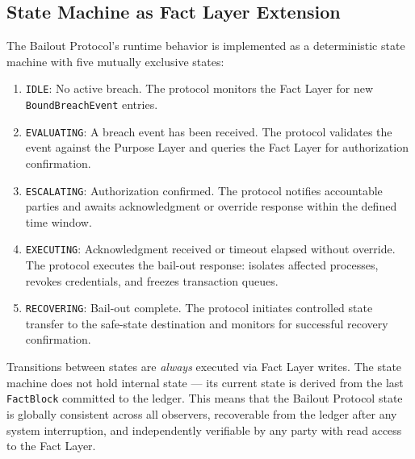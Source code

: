\subsection{State Machine as Fact Layer Extension}
\label{sec:state-machine-fact-extension}

The Bailout Protocol's runtime behavior is implemented as a deterministic state machine with five mutually exclusive states:

\begin{enumerate}
    \item \texttt{IDLE}: No active breach. The protocol monitors the Fact Layer for new \texttt{BoundBreachEvent} entries.
    \item \texttt{EVALUATING}: A breach event has been received. The protocol validates the event against the Purpose Layer and queries the Fact Layer for authorization confirmation.
    \item \texttt{ESCALATING}: Authorization confirmed. The protocol notifies accountable parties and awaits acknowledgment or override response within the defined time window.
    \item \texttt{EXECUTING}: Acknowledgment received or timeout elapsed without override. The protocol executes the bail-out response: isolates affected processes, revokes credentials, and freezes transaction queues.
    \item \texttt{RECOVERING}: Bail-out complete. The protocol initiates controlled state transfer to the safe-state destination and monitors for successful recovery confirmation.
\end{enumerate}

Transitions between states are \textit{always} executed via Fact Layer writes. The state machine does not hold internal state — its current state is derived from the last \texttt{FactBlock} committed to the ledger. This means that the Bailout Protocol state is globally consistent across all observers, recoverable from the ledger after any system interruption, and independently verifiable by any party with read access to the Fact Layer.

